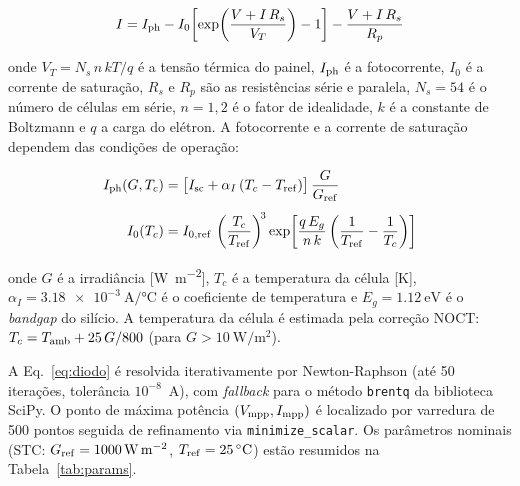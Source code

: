 \documentclass[11pt,a4paper]{article}
\begin{document}
\begin{equation}
  I = I_{\rm ph} - I_0\!\left[\exp\!\left(\frac{V + I\,R_s}{V_T}\right) - 1\right]
      - \frac{V + I\,R_s}{R_p}
  \label{eq:diodo}
\end{equation}

\noindent onde $V_T = N_s\,n\,kT/q$ é a tensão térmica do painel,
$I_{\rm ph}$ é a fotocorrente, $I_0$ é a corrente de saturação,
$R_s$ e $R_p$ são as resistências série e paralela, $N_s = 54$ é o número de
células em série, $n = 1{,}2$ é o fator de idealidade, $k$ é a constante de
Boltzmann e $q$ a carga do elétron. A fotocorrente e a corrente de saturação
dependem das condições de operação:

\begin{align}
  I_{\rm ph}(G, T_c) &= \bigl[I_{\rm sc} + \alpha_I\,(T_c - T_{\rm ref})\bigr]
                        \,\frac{G}{G_{\rm ref}} \label{eq:Iph}\\[4pt]
  I_0(T_c) &= I_{0,\rm ref}\,\left(\frac{T_c}{T_{\rm ref}}\right)^{\!3}
              \exp\!\left[\frac{q\,E_g}{n\,k}
              \left(\frac{1}{T_{\rm ref}} - \frac{1}{T_c}\right)\right]
              \label{eq:I0}
\end{align}

\noindent onde $G$ é a irradiância [\si{\watt\per\meter\squared}], $T_c$ é a
temperatura da célula [K], $\alpha_I = \SI{3,18e-3}{\ampere\per\celsius}$ é o
coeficiente de temperatura e $E_g = \SI{1,12}{\electronvolt}$ é o \textit{bandgap}
do silício. A temperatura da célula é estimada pela correção NOCT:
$T_c = T_{\rm amb} + 25\,G/800$ (para $G > \SI{10}{\watt\per\meter\squared}$).

A Eq.~\eqref{eq:diodo} é resolvida iterativamente por Newton-Raphson (até 50
iterações, tolerância $10^{-8}$~A), com \textit{fallback} para o método
\texttt{brentq} da biblioteca SciPy. O ponto de máxima potência
$(V_{\rm mpp}, I_{\rm mpp})$ é localizado por varredura de 500 pontos seguida de
refinamento via \texttt{minimize\_scalar}. Os parâmetros nominais (STC: $G_{\rm ref} =
\SI{1000}{\watt\per\meter\squared}$, $T_{\rm ref} = \SI{25}{\celsius}$) estão
resumidos na Tabela~\ref{tab:params}.
\end{document}
